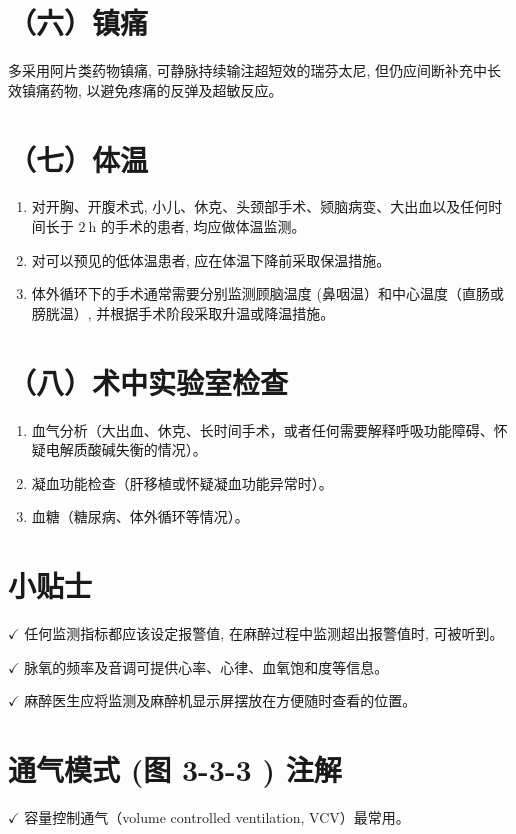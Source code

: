 \documentclass[10pt]{article}
\begin{document}
\section*{（六）镇痛}
多采用阿片类药物镇痛, 可静脉持续输注超短效的瑞芬太尼, 但仍应间断补充中长效镇痛药物, 以避免疼痛的反弹及超敏反应。

\section*{（七）体温}
\begin{enumerate}
  \item 对开胸、开腹术式, 小儿、休克、头颈部手术、颎脑病变、大出血以及任何时间长于 $2 \mathrm{~h}$ 的手术的患者, 均应做体温监测。

  \item 对可以预见的低体温患者, 应在体温下降前采取保温措施。

  \item 体外循环下的手术通常需要分别监测顾脑温度 (鼻咽温）和中心温度（直肠或膀胱温）, 并根据手术阶段采取升温或降温措施。

\end{enumerate}

\section*{（八）术中实验室检查}
\begin{enumerate}
  \item 血气分析（大出血、休克、长时间手术，或者任何需要解释呼吸功能障碍、怀疑电解质酸碱失衡的情况）。

  \item 凝血功能检查（肝移植或怀疑凝血功能异常时）。

  \item 血糖（糖尿病、体外循环等情况）。

\end{enumerate}

\section*{小贴士}
$\checkmark$ 任何监测指标都应该设定报警值, 在麻醉过程中监测超出报警值时, 可被听到。

$\checkmark$ 脉氧的频率及音调可提供心率、心律、血氧饱和度等信息。

$\checkmark$ 麻醉医生应将监测及麻醉机显示屏摆放在方便随时查看的位置。

\section*{通气模式 (图 3-3-3 ) 注解}
$\checkmark$ 容量控制通气（volume controlled ventilation, VCV）最常用。
\end{document}
